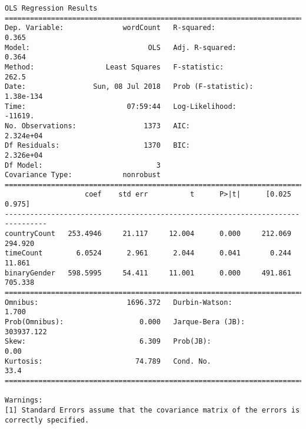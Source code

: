 \documentclass[11pt]{article}
\begin{document}
    \begin{Verbatim}[commandchars=\\\{\}]
                            OLS Regression Results                            
==============================================================================
Dep. Variable:              wordCount   R-squared:                       0.365
Model:                            OLS   Adj. R-squared:                  0.364
Method:                 Least Squares   F-statistic:                     262.5
Date:                Sun, 08 Jul 2018   Prob (F-statistic):          1.38e-134
Time:                        07:59:44   Log-Likelihood:                -11619.
No. Observations:                1373   AIC:                         2.324e+04
Df Residuals:                    1370   BIC:                         2.326e+04
Df Model:                           3                                         
Covariance Type:            nonrobust                                         
================================================================================
                   coef    std err          t      P>|t|      [0.025      0.975]
--------------------------------------------------------------------------------
countryCount   253.4946     21.117     12.004      0.000     212.069     294.920
timeCount        6.0524      2.961      2.044      0.041       0.244      11.861
binaryGender   598.5995     54.411     11.001      0.000     491.861     705.338
==============================================================================
Omnibus:                     1696.372   Durbin-Watson:                   1.700
Prob(Omnibus):                  0.000   Jarque-Bera (JB):           303937.122
Skew:                           6.309   Prob(JB):                         0.00
Kurtosis:                      74.789   Cond. No.                         33.4
==============================================================================

Warnings:
[1] Standard Errors assume that the covariance matrix of the errors is correctly specified.

    \end{Verbatim}
\end{document}
